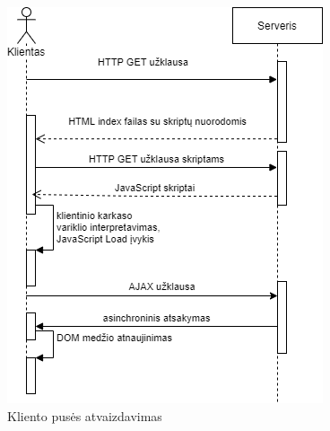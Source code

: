 \begin{figure}[ht]
\centering
\includegraphics[scale=0.75]{img/csr.png}
\caption{Kliento pusės atvaizdavimas \cite{JavaScriptCrawl}}
\label{fig:client_side|_rendering}
\end{figure}